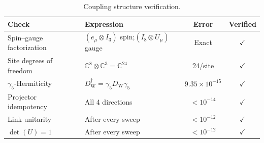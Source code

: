 \documentclass[12pt]{article}
\newcommand{\dW}{D_{\mathrm{W}}}       %
\begin{document}
\begin{table}[ht]
\centering
\caption{Coupling structure verification.}
\label{tab:B5}
\begin{tabular}{@{}llcc@{}}
  \toprule
  \textbf{Check} & \textbf{Expression} & \textbf{Error}
    & \textbf{Verified} \\
  \midrule
  Spin--gauge factorization
    & $(e_\mu\otimes I_3)$ spin;\;$(I_8\otimes U_\mu)$ gauge
    & Exact & $\checkmark$ \\
  Site degrees of freedom
    & $\mathbb{C}^8\otimes\mathbb{C}^3=\mathbb{C}^{24}$
    & 24/site & $\checkmark$ \\
  $\gamma_5$-Hermiticity
    & $\dW^\dagger=\gamma_5\dW\gamma_5$
    & $9.35\times10^{-15}$ & $\checkmark$ \\
  Projector idempotency & All 4 directions
    & ${<}10^{-14}$ & $\checkmark$ \\
  Link unitarity & After every sweep
    & ${<}10^{-12}$ & $\checkmark$ \\
  $\det(U)=1$ & After every sweep
    & ${<}10^{-12}$ & $\checkmark$ \\
  \bottomrule
\end{tabular}
\end{table}
\end{document}
